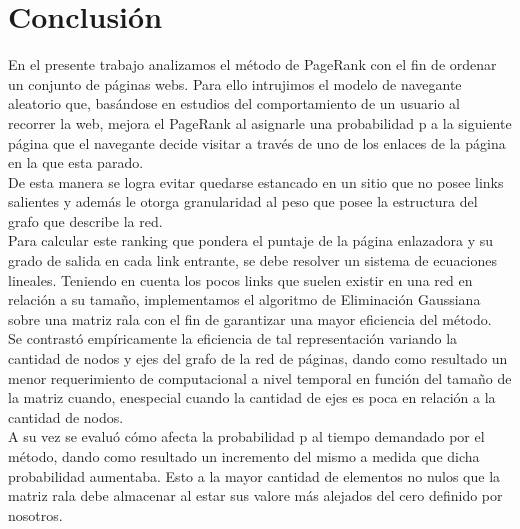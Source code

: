 \section{Conclusión}

En el presente trabajo analizamos el método de PageRank con el fin de ordenar un conjunto de páginas webs. Para ello intrujimos el modelo de navegante aleatorio que, basándose en estudios del comportamiento de un usuario al recorrer la web, mejora el PageRank al asignarle una probabilidad p a la siguiente página que el navegante decide visitar a través de uno de los enlaces de la página en la que esta parado.\\
De esta manera se logra evitar quedarse estancado en un sitio que no posee links salientes y además le otorga granularidad al peso que posee la estructura del grafo que describe la red.\\
Para calcular este ranking que pondera el puntaje de la página enlazadora y su grado de salida en cada link entrante, se debe resolver un sistema de ecuaciones lineales. Teniendo en cuenta los pocos links que suelen existir en una red en relación a su tamaño, implementamos el algoritmo de Eliminación Gaussiana sobre una matriz rala con el fin de garantizar una mayor eficiencia del método.\\

Se contrastó empíricamente la eficiencia de tal representación variando la cantidad de nodos y ejes del grafo de la red de páginas, dando como resultado un menor requerimiento de computacional a nivel temporal en función del tamaño de la matriz cuando, enespecial cuando la cantidad de ejes es poca en relación a la cantidad de nodos. \\
A su vez se evaluó cómo afecta la probabilidad p al tiempo demandado por el método, dando como resultado un incremento del mismo a medida que dicha probabilidad aumentaba. Esto a la mayor cantidad de elementos no nulos que la matriz rala debe almacenar al estar sus valore más alejados del cero definido por nosotros. \\

